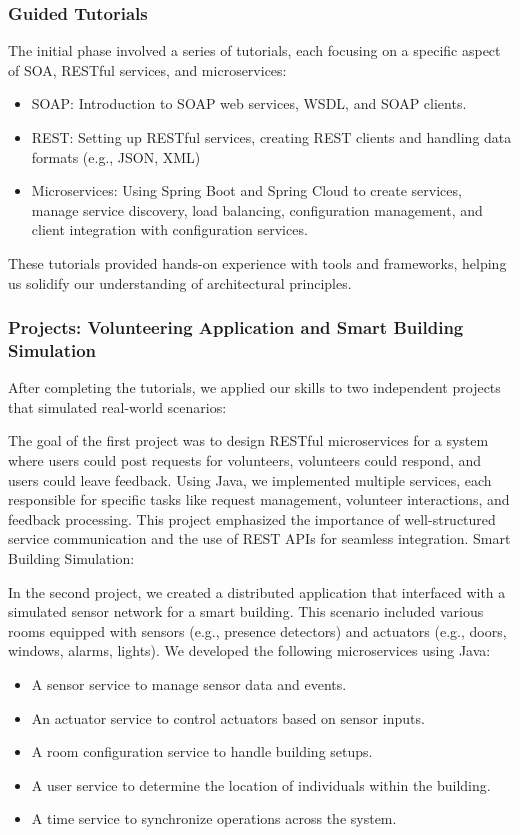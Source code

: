 \subsubsection{Guided Tutorials}
The initial phase involved a series of tutorials, each focusing on a specific aspect of SOA, RESTful services, and microservices:
\begin{itemize}
    \item SOAP: Introduction to SOAP web services, WSDL, and SOAP clients.
    \item REST: Setting up RESTful services, creating REST clients and handling data formats (e.g., JSON, XML)
    \item Microservices: Using Spring Boot and Spring Cloud to create services, manage service discovery, load balancing, configuration management, and client integration with configuration services.
\end{itemize}
These tutorials provided hands-on experience with tools and frameworks, helping us solidify our understanding of architectural principles.

\subsubsection{Projects: Volunteering Application and Smart Building Simulation}
After completing the tutorials, we applied our skills to two independent projects that simulated real-world scenarios:

\vspace{0.25cm}
\noindent The goal of the first project was to design RESTful microservices for a system where users could post requests for volunteers, volunteers could respond, and users could leave feedback.
Using Java, we implemented multiple services, each responsible for specific tasks like request management, volunteer interactions, and feedback processing. This project emphasized the importance of well-structured service communication and the use of REST APIs for seamless integration.
Smart Building Simulation:

\vspace{0.25cm}
\noindent In the second project, we created a distributed application that interfaced with a simulated sensor network for a smart building. This scenario included various rooms equipped with sensors (e.g., presence detectors) and actuators (e.g., doors, windows, alarms, lights).
We developed the following microservices using Java:
\begin{itemize}
    \item A sensor service to manage sensor data and events.
    \item An actuator service to control actuators based on sensor inputs.
    \item A room configuration service to handle building setups.
    \item A user service to determine the location of individuals within the building.
    \item A time service to synchronize operations across the system.
\end{itemize}

